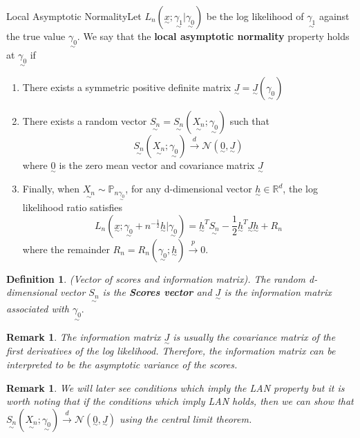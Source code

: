 \documentclass[twoside]{article}
\newtheorem{definition}[theorem]{Definition}
\newtheorem{remark}[theorem]{Remark}
\newcommand{\prob}{\mathbb{P}}
\newcommand{\utilde}{\underset{\sim}}
\begin{document}
\newpage
\begin{definition_exam}{Local Asymptotic Normality}{}Let $L_n(\utilde{x}; \utilde{\gamma_1}|\utilde{\gamma_0})$ be the log likelihood of $\utilde{\gamma_1}$ against the true value $\utilde{\gamma_0}.$ We say that the \textbf{local asymptotic normality} property holds at $\utilde{\gamma_0}$ if 

\begin{enumerate}
\item There exists a symmetric positive definite matrix $\utilde{J} = \utilde{J}(\utilde{\gamma_0})$ 
\item There exists a random vector $\utilde{S_n} = \utilde{S_n}(\utilde{X_n}; \utilde{\gamma_0})$ such that 
\begin{equation}
\utilde{S_n}(\utilde{X_n}; \utilde{\gamma_0}) \xrightarrow{d} \mathcal{N}(\utilde{0}, \utilde{J})
\end{equation}
where $\utilde{0}$ is the zero mean vector and covariance matrix $\utilde{J}$ 
\item Finally, when $\utilde{X_n} \sim \prob_{n \utilde{\gamma_0}}$, for any d-dimensional vector $\utilde{h} \in \mathbb{R}^d$, the log likelihood ratio satisfies 
\begin{equation}
L_n(\utilde{x}; \utilde{\gamma_0} + n^{-\frac{1}{2}}\utilde{h}|\utilde{\gamma_0}) = \utilde{h}^T\utilde{S_n} - \frac{1}{2}\utilde{h}^T\utilde{J}\utilde{h} + R_n
\end{equation}
where the remainder $R_n = R_n(\utilde{\gamma_0}; \utilde{h}) \xrightarrow{p} 0.$
\end{enumerate}
\end{definition_exam}

\begin{definition}(Vector of scores and information matrix). The random d-dimensional vector $\utilde{S_n}$ is the \textbf{Scores vector} and $\utilde{J}$ is the information matrix associated with $\utilde{\gamma_{0}}.$
\end{definition}

\begin{remark}The information matrix $\utilde{J}$ is usually the covariance matrix of the first derivatives of the log likelihood. Therefore, the information matrix can be interpreted to be the asymptotic variance of the scores.
\end{remark}

\begin{remark} We will later see conditions which imply the LAN property but it is worth noting that if the conditions which imply LAN holds, then we can show that $
\utilde{S_n}(\utilde{X_n}; \utilde{\gamma_0}) \xrightarrow{d} \mathcal{N}(\utilde{0}, \utilde{J})
$ using the central limit theorem.
\end{remark}
\end{document}
